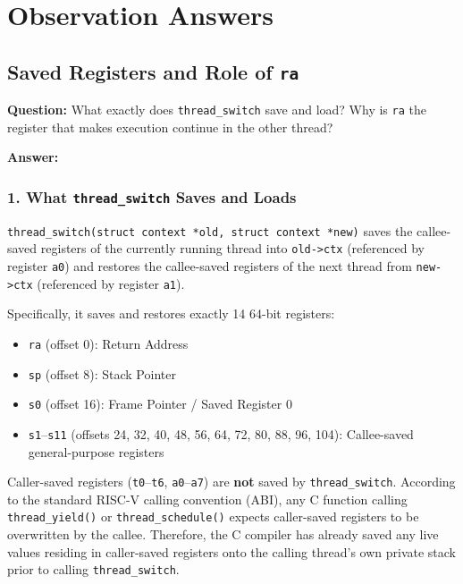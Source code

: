 \documentclass[12pt,a4paper]{article}
\begin{document}
\section{Observation Answers}

\subsection{Saved Registers and Role of \texttt{ra}}
\textbf{Question:} What exactly does \texttt{thread\_switch} save and load? Why is \texttt{ra} the register that makes execution continue in the other thread?

\textbf{Answer:}

\subsubsection{1. What \texttt{thread\_switch} Saves and Loads}
\texttt{thread\_switch(struct context *old, struct context *new)} saves the callee-saved registers of the currently running thread into \texttt{old->ctx} (referenced by register \texttt{a0}) and restores the callee-saved registers of the next thread from \texttt{new->ctx} (referenced by register \texttt{a1}).

Specifically, it saves and restores exactly 14 64-bit registers:
\begin{itemize}
    \item \texttt{ra} (offset 0): Return Address
    \item \texttt{sp} (offset 8): Stack Pointer
    \item \texttt{s0} (offset 16): Frame Pointer / Saved Register 0
    \item \texttt{s1}--\texttt{s11} (offsets 24, 32, 40, 48, 56, 64, 72, 80, 88, 96, 104): Callee-saved general-purpose registers
\end{itemize}

Caller-saved registers (\texttt{t0}--\texttt{t6}, \texttt{a0}--\texttt{a7}) are \textbf{not} saved by \texttt{thread\_switch}. According to the standard RISC-V calling convention (ABI), any C function calling \texttt{thread\_yield()} or \texttt{thread\_schedule()} expects caller-saved registers to be overwritten by the callee. Therefore, the C compiler has already saved any live values residing in caller-saved registers onto the calling thread's own private stack prior to calling \texttt{thread\_switch}.
\end{document}
